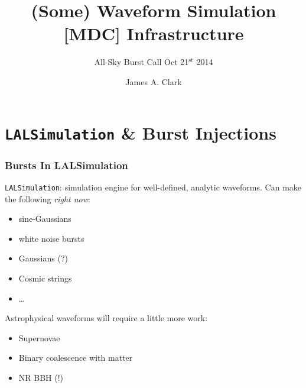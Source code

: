 \documentclass{beamer}
\begin{document}
\title{(Some) Waveform Simulation [MDC] Infrastructure}
\subtitle{All-Sky Burst Call Oct 21$^{\text{st}}$ 2014}  
\author{James A. Clark}
\date{} 

\begin{frame}[plain]
\titlepage
\end{frame}


\section{{\tt LALSimulation} \& Burst Injections}

\begin{frame}
    \frametitle{Bursts In LALSimulation}
    {\tt LALSimulation}: simulation engine for well-defined, analytic waveforms.
    Can make the following \emph{right now}:
    \begin{itemize}
        \item sine-Gaussians
        \item white noise bursts
        \item Gaussians (?)
        \item Cosmic strings
        \item \dots
    \end{itemize}
    Astrophysical waveforms will require a little more work:
    \begin{itemize}
        \item Supernovae
        \item Binary coalescence with matter
        \item NR BBH (!)
    \end{itemize}
\end{frame}
\end{document}
